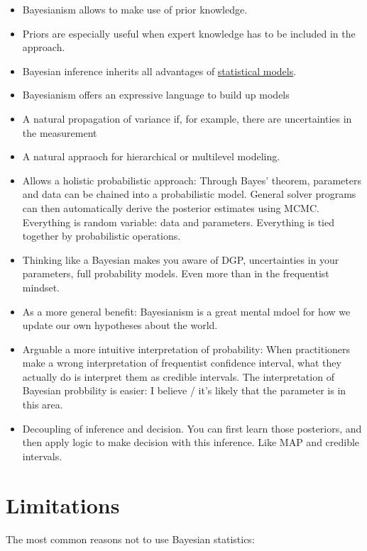 \documentclass[
  10pt,
]{scrbook}
\providecommand{\tightlist}{%
  \setlength{\itemsep}{0pt}\setlength{\parskip}{0pt}}
\begin{document}
\begin{itemize}
\tightlist
\item
  Bayesianism allows to make use of prior knowledge.
\item
  Priors are especially useful when expert knowledge has to be included in the approach.
\item
  Bayesian inference inherits all advantages of \protect\hyperlink{statistical-modeling}{statistical models}.
\item
  Bayesianism offers an expressive language to build up models
\item
  A natural propagation of variance if, for example, there are uncertainties in the measurement
\item
  A natural appraoch for hierarchical or multilevel modeling.
\item
  Allows a holistic probabilistic approach: Through Bayes' theorem, parameters and data can be chained into a probabilistic model. General solver programs can then automatically derive the posterior estimates using MCMC. Everything is random variable: data and parameters. Everything is tied together by probabilistic operations.
\item
  Thinking like a Bayesian makes you aware of DGP, uncertainties in your parameters, full probability models. Even more than in the frequentist mindset.
\item
  As a more general benefit: Bayesianism is a great mental mdoel for how we update our own hypotheses about the world.
\item
  Arguable a more intuitive interpretation of probability: When practitioners make a wrong interpretation of frequentist confidence interval, what they actually do is interpret them as credible intervals. The interpretation of Bayesian probbility is easier: I believe / it's likely that the parameter is in this area.
\item
  Decoupling of inference and decision. You can first learn those posteriors, and then apply logic to make decision with this inference. Like MAP and credible intervals.
\end{itemize}

\hypertarget{limitations-2}{%
\section{Limitations}\label{limitations-2}}

The most common reasons not to use Bayesian statistics:
\end{document}
